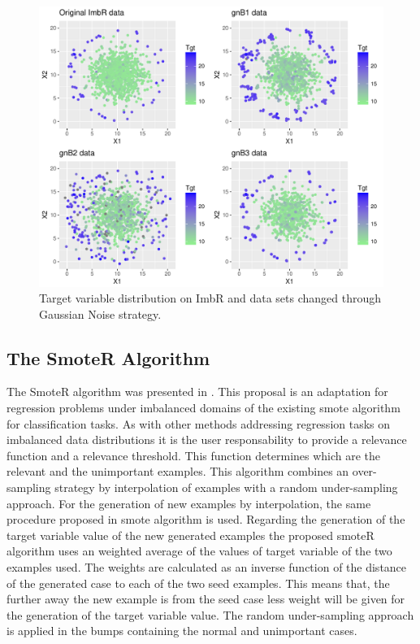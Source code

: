 \documentclass[10pt,a4paper]{article}\usepackage[]{graphicx}\usepackage[]{color}
\makeatletter
\def\maxwidth{ %
  \ifdim\Gin@nat@width>\linewidth
    \linewidth
  \else
    \Gin@nat@width
  \fi
}
\newenvironment{knitrout}{}{} %
\makeatother
\begin{document}
\begin{knitrout}\footnotesize
{}\color{fgcolor}\begin{figure}

{\centering \includegraphics[width=\maxwidth]{figures/UBL-GN_plot3_dist-1} 

}

\caption[Target variable distribution on ImbR and data sets changed through Gaussian Noise strategy]{Target variable distribution on ImbR and data sets changed through Gaussian Noise strategy.}\label{fig:GN_plot3_dist}
\end{figure}


\end{knitrout}


\subsection{The SmoteR Algorithm}\label{sec:smoteR}

The SmoteR algorithm was presented in \cite{torgo2013smote}. This proposal is an adaptation for regression problems under imbalanced domains of the existing smote algorithm \cite{CBOK02} for classification tasks. As with other methods addressing regression tasks on imbalanced data distributions it is the user responsability to provide a relevance function and a relevance threshold. This function determines which are the relevant and the unimportant examples. This algorithm combines an over-sampling strategy by interpolation of examples with a random under-sampling approach. For the generation of new examples by interpolation, the same procedure proposed in smote algorithm is used. Regarding the generation of the target variable value of the new generated examples the proposed smoteR algorithm uses an weighted average of the values of target variable of the two examples used. The weights are calculated as an inverse function of the distance of the generated case to each of the two seed examples. This means that, the further away the new example is from the seed case less weight will be given for the generation of the target variable value. The random under-sampling approach is applied in the bumps containing the normal and unimportant cases. 
\end{document}
